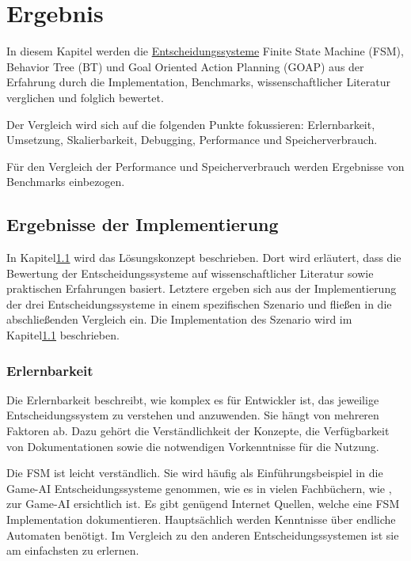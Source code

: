 \chapter{Ergebnis}
\label{chap:ergebnis}

In diesem Kapitel werden die \hyperref[chap:entscheidungssysteme]{Entscheidungssysteme} Finite State Machine (FSM), Behavior Tree (BT) und Goal Oriented Action Planning (GOAP) aus der Erfahrung durch die Implementation, Benchmarks, wissenschaftlicher Literatur verglichen und folglich bewertet.

Der Vergleich wird sich auf die folgenden Punkte fokussieren: Erlernbarkeit, Umsetzung, Skalierbarkeit, Debugging, Performance und Speicherverbrauch. 

F\"{u}r den Vergleich der Performance und Speicherverbrauch werden Ergebnisse von Benchmarks einbezogen.

\section{Ergebnisse der Implementierung}

In Kapitel\ref{} wird das L\"{o}sungskonzept beschrieben. Dort wird erl\"{a}utert, dass die Bewertung der Entscheidungssysteme auf wissenschaftlicher Literatur sowie praktischen Erfahrungen basiert. Letztere ergeben sich aus der Implementierung der drei Entscheidungssysteme in einem spezifischen Szenario und flie\ss{}en in die abschlie\ss{}enden Vergleich ein. Die Implementation des Szenario wird im Kapitel\ref{} beschrieben.


\subsection{Erlernbarkeit}
\label{chap:erlernbarkeit}

Die Erlernbarkeit beschreibt, wie komplex es f\"{u}r Entwickler ist, das jeweilige Entscheidungssystem zu verstehen und anzuwenden. Sie h\"{a}ngt von mehreren Faktoren ab. Dazu geh\"{o}rt die Verst\"{a}ndlichkeit der Konzepte, die Verf\"{u}gbarkeit von Dokumentationen sowie die notwendigen Vorkenntnisse f\"{u}r die Nutzung.

Die FSM ist leicht verst\"{a}ndlich. Sie wird h\"{a}ufig als Einf\"{u}hrungsbeispiel in die Game-AI Entscheidungssysteme genommen, wie es in vielen Fachb\"{u}chern, wie \autocite{}, zur Game-AI ersichtlich ist. Es gibt gen\"{u}gend Internet Quellen, welche eine FSM Implementation dokumentieren. Haupts\"{a}chlich werden Kenntnisse \"{u}ber endliche Automaten ben\"{o}tigt. Im Vergleich zu den anderen Entscheidungssystemen ist sie am einfachsten zu erlernen.

